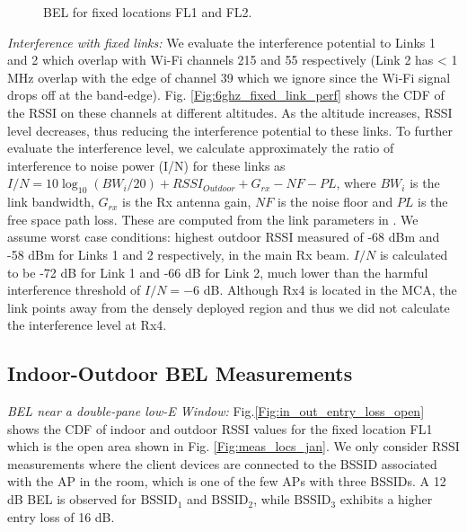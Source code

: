 \documentclass[sigconf,10pt]{acmart}
\begin{document}
\begin{figure}
     \centering
     \begin{subfigure}[Double-pane low-E window.]{\centering
    \texttt{[image: Figures/indoor\_outdoor\_entry\_loss\_15dbm\_4.pdf]}
\label{Fig:in_out_entry_loss_open}}
    \end{subfigure} \hspace{-7mm}
     \begin{subfigure}[Solid brick wall.]{
         \centering
         \texttt{[image: Figures/cdfplot\_perBSSID\_indoorclosedarea.pdf]}
\label{Fig:in_out_entry_loss_closed}}
     \end{subfigure} \vspace{-1em}
    \caption{BEL for fixed locations FL1  and FL2.}
    \label{Fig:in_out_entry_loss}
    \vspace{-2em}
\end{figure}

{\it Interference with fixed links:}
We evaluate the interference potential to Links 1 and 2 which overlap with Wi-Fi channels 215 and 55 respectively (Link 2 has < 1 MHz overlap with the edge of channel 39 which we ignore since the Wi-Fi signal drops off at the band-edge). Fig. \ref{Fig:6ghz_fixed_link_perf} shows the CDF of the RSSI on these channels at different altitudes. As the altitude increases, RSSI level decreases, thus reducing the interference potential to these links. To further evaluate the interference level, we calculate approximately the ratio of interference to noise power (I/N)  for these links as $ I/N = 10\log_{10}(BW_i/20)+ RSSI_{Outdoor}+G_{rx}-NF-PL$, where $BW_i$ is the link bandwidth, $G_{rx}$ is the Rx antenna gain, $NF$ is the noise floor and $PL$ is the free space path loss. These are computed from the link parameters in \cite{link1,link2}. We assume worst case conditions: highest outdoor RSSI measured of -68 dBm and
 -58 dBm for Links 1 and 2 respectively, in the main Rx beam. $I/N$ is calculated to be -72 dB for Link 1 and -66 dB for Link 2, much lower than the harmful interference threshold of $I/N = -6$ dB.
 Although Rx4 is located in the MCA, the link points away from the densely deployed region and thus we did not calculate the interference level at Rx4.

\subsection{Indoor-Outdoor BEL Measurements}

{\it BEL near a double-pane low-E Window:} Fig.\ref{Fig:in_out_entry_loss_open} shows the CDF of indoor and outdoor RSSI values for the fixed location FL1 which is the open area shown in Fig. \ref{Fig:meas_locs_jan}. We only consider RSSI measurements where the client devices are connected to the BSSID associated with the AP in the room,  which is one of the few APs with three BSSIDs. 
A 12 dB BEL is observed for $\text{BSSID}_{1}$ and $\text{BSSID}_{2}$, while $\text{BSSID}_3$ exhibits a higher entry loss of 16 dB.   
\end{document}
